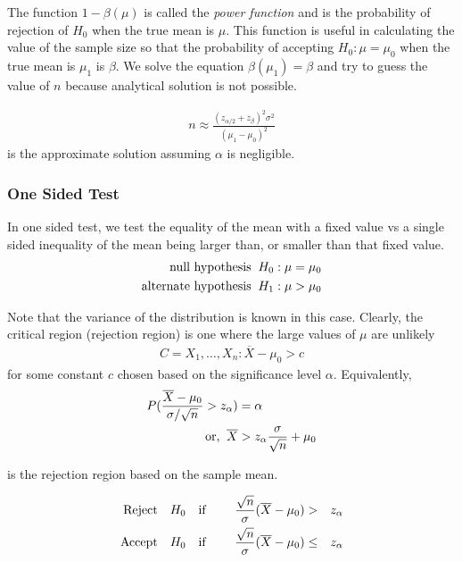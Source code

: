 \documentclass[../probability-notes.tex]{subfiles}
\begin{document}
    The function $1 - \beta(\mu)$ is called the \emph{power function} and is the probability of rejection of $H_{0}$ when the true mean is $\mu$. This function is useful in calculating the value of the sample size so that the probability of accepting $H_{0}: \mu = \mu_{0}$ when the true mean is $\mu_{1}$ is $\beta$. We solve the equation $\beta(\mu_{1}) = \beta$ and try to guess the value of $n$ because analytical solution is not possible.

    \begin{align*}
         n \approx \frac{(z_{\alpha/2} + z_{\beta})^{2} \sigma^{2}}{(\mu_{1} - \mu_{0})^{2}}
    \end{align*}
    is the approximate solution assuming $\alpha$ is negligible.


    \subsubsection{One Sided Test}
    In one sided test, we test the equality of the mean with a fixed value vs a single sided inequality of the mean being larger than, or smaller than that fixed value.
    \begin{align*}
        \text{null hypothesis \:} H_{0}&: \mu = \mu_{0}\\
        \text{alternate hypothesis \:} H_{1}&: \mu > \mu_{0}
    \end{align*}

    Note that the variance of the distribution is known in this case. Clearly, the critical region (rejection region) is one where the large values of $\mu$ are unlikely
    \begin{align*}
        C = {X_{1}, \ldots, X_{n}: \overline{X} - \mu_{0} > c}
    \end{align*}
    for some constant $c$ chosen based on the significance level $\alpha$. Equivalently,
    \begin{align*}
        P(\frac{\overline{X} - \mu_{0}}{\sigma/\sqrt{n}} > z_{\alpha}) &= \alpha\\
        \text{or, \:} \overline{X} &> z_{\alpha}\frac{\sigma}{\sqrt{n}} + \mu_{0}
    \end{align*}

    is the rejection region based on the sample mean.

    \begin{alignat*}{4}
        \text{Reject\quad} &H_{0} \text{\quad if \quad} &\frac{\sqrt{n}}{\sigma}(\overline{X} - \mu_{0}) &> &z_{\alpha}\\
        \text{Accept\quad} &H_{0} \text{\quad if\quad} &\frac{\sqrt{n}}{\sigma}(\overline{X} - \mu_{0}) &\leq &z_{\alpha}\\
    \end{alignat*}
\end{document}
